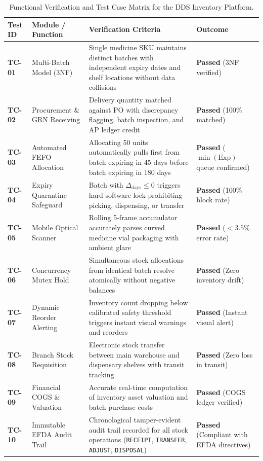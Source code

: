 \begin{table}[htbp]
\centering
\caption{Functional Verification and Test Case Matrix for the DDS Inventory Platform.}
\label{tab:verification_matrix}
\begin{tabularx}{\textwidth}{@{}p{}p{}p{}X@{}}
\toprule
\textbf{Test ID} & \textbf{Module / Function} & \textbf{Verification Criteria} & \textbf{Outcome} \\
\midrule
\textbf{TC-01} & Multi-Batch Model (3NF) & Single medicine SKU maintains distinct batches with independent expiry dates and shelf locations without data collisions & \textbf{Passed} (3NF verified) \\
\addlinespace
\textbf{TC-02} & Procurement \& GRN Receiving & Delivery quantity matched against PO with discrepancy flagging, batch inspection, and AP ledger credit & \textbf{Passed} (100\% matched) \\
\addlinespace
\textbf{TC-03} & Automated FEFO Allocation & Allocating 50 units automatically pulls first from batch expiring in 45 days before batch expiring in 180 days & \textbf{Passed} ($\min(\text{Exp})$ queue confirmed) \\
\addlinespace
\textbf{TC-04} & Expiry Quarantine Safeguard & Batch with $\Delta_{\text{days}} \le 0$ triggers hard software lock prohibiting picking, dispensing, or transfer & \textbf{Passed} (100\% block rate) \\
\addlinespace
\textbf{TC-05} & Mobile Optical Scanner & Rolling 5-frame accumulator accurately parses curved medicine vial packaging with ambient glare & \textbf{Passed} ($<3.5\%$ error rate) \\
\addlinespace
\textbf{TC-06} & Concurrency Mutex Hold & Simultaneous stock allocations from identical batch resolve atomically without negative balances & \textbf{Passed} (Zero inventory drift) \\
\addlinespace
\textbf{TC-07} & Dynamic Reorder Alerting & Inventory count dropping below calibrated safety threshold triggers instant visual warnings and reorders & \textbf{Passed} (Instant visual alert) \\
\addlinespace
\textbf{TC-08} & Branch Stock Requisition & Electronic stock transfer between main warehouse and dispensary shelves with transit tracking & \textbf{Passed} (Zero loss in transit) \\
\addlinespace
\textbf{TC-09} & Financial COGS \& Valuation & Accurate real-time computation of inventory asset valuation and batch purchase costs & \textbf{Passed} (COGS ledger verified) \\
\addlinespace
\textbf{TC-10} & Immutable EFDA Audit Trail & Chronological tamper-evident audit trail recorded for all stock operations (\texttt{RECEIPT}, \texttt{TRANSFER}, \texttt{ADJUST}, \texttt{DISPOSAL}) & \textbf{Passed} (Compliant with EFDA directives) \\
\bottomrule
\end{tabularx}
\end{table}

